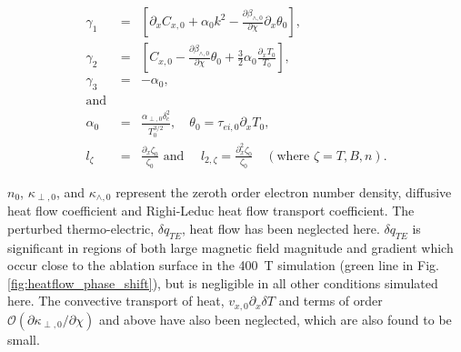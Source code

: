 \documentclass[aip,reprint]{revtex4-1}
\begin{document}
\begin{eqnarray}
\gamma_1 &=&\left[ \partial_x C_{x,0} + \alpha_0 k^2 - \frac{\partial \beta_{\wedge,0}}{\partial \chi}\partial_x \theta_0 \right],\nonumber\\
\gamma_2 &=&\left[ C_{x,0} -  \frac{\partial \beta_{\wedge,0}}{\partial \chi}  \theta_0 +\frac{3}{2}\alpha_0 \frac{\partial_x T_0}{T_0} \right ],\nonumber\\
\gamma_3 &=& -\alpha_0, \nonumber \\
\mbox{and } && \nonumber\\
\alpha_0 &=& \frac{\alpha_{\perp,0} \delta_c^2}{T_0^{3/2}}, \quad \theta_0 = \tau_{ei,0}\partial_x T_{0} , \nonumber\\
l_{\zeta} &=& \frac{\partial_x \zeta_0}{\zeta_0} \mbox{ and }\quad  l_{2,\zeta} = \frac{\partial_x^2 \zeta_0}{\zeta_0} \quad(\mbox{where } \zeta = T, B, n). \nonumber
\end{eqnarray}

$n_{0}$, $\kappa_{\perp,0}$, and $\kappa_{\wedge,0}$ represent the zeroth order electron number density, diffusive heat flow coefficient and Righi-Leduc heat flow transport coefficient. The perturbed thermo-electric, $\delta q_{TE}$, heat flow has been neglected here. $\delta q_{TE}$ is significant in regions of both large magnetic field magnitude and gradient which occur close to the ablation surface in the \SI{400}{T} simulation (green line in Fig. \ref{fig:heatflow_phase_shift}), but is negligible in all other conditions simulated here.  The convective transport of heat, $v_{x,0}\partial_x\delta T$ and terms of order $\mathcal{O}(\partial \kappa_{\perp,0}/\partial \chi)$ and above have also been neglected, which are also found to be small.
\end{document}
